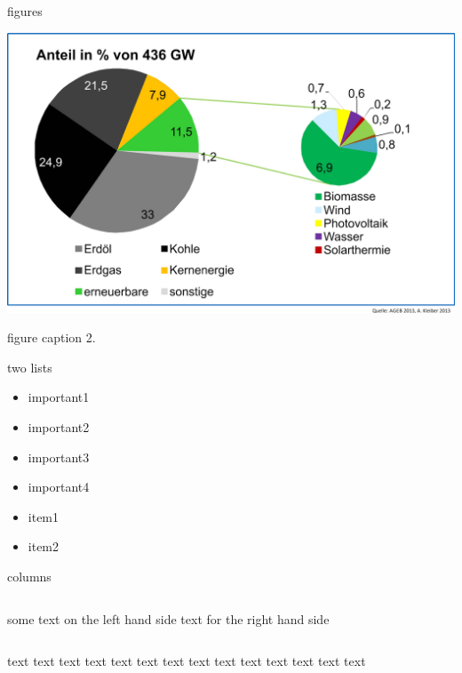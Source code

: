 \documentclass[final]{beamer} %
\begin{document}
\begin{frame}
\begin{minipage}[t]{.49\textwidth}
\begin{kasten}{\large figures}
\begin{center}
\begin{minipage}[]{0.45\textwidth}
{        \includegraphics[width=.8\textwidth]{primaerenergieverbrauch_dt_2013}}\par
        figure caption 2.
      \end{minipage}
      \end{center}
    \end{kasten}
    \begin{kasten}{\large two lists}
      \begin{itemize}
        \item important1
        \item important2
        \item important3
        \item important4
      \end{itemize}
      \begin{itemize}
        \item item1
        \item item2
      \end{itemize}
    \end{kasten}
  \end{minipage}\hfill
  \begin{minipage}[t]{.49\textwidth}
    \begin{kasten}{\large columns}
      \begin{columns}
        \column{6cm}
          some text on the left hand side
        \column{4cm}
          text for the right hand side
      \end{columns}
    \end{kasten}
    \begin{kasten}{\large text}
      text text text text text text text text text text text text text 

\end{kasten}
\end{minipage}
\end{frame}
\end{document}
